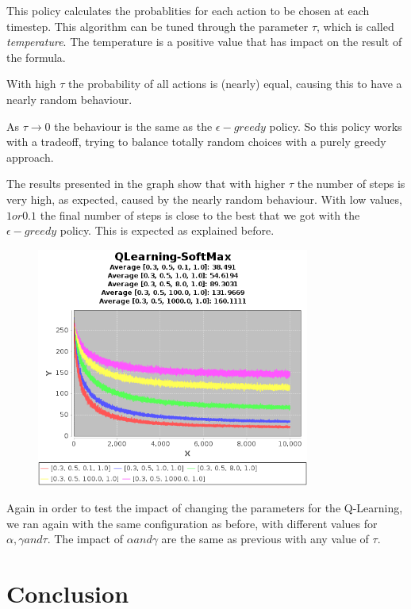 \documentclass{article}
\begin{document}
This policy calculates the probablities for each action to be chosen at each
timestep. This algorithm can be tuned through the parameter $\tau$, which is
called \emph{temperature}.
The temperature is a positive value that has impact on the result of the
formula.

With high $\tau$ the probability of all actions is (nearly) equal, causing
this to have a nearly random behaviour.

As $\tau \rightarrow 0$ the behaviour is the same as the $\epsilon-greedy$
policy.
So this policy works with a tradeoff, trying to balance totally random choices with a purely greedy approach.

The results presented in the graph show that with higher $\tau$ the number of
steps is very high, as expected, caused by the nearly random behaviour. With low
values, $1 or 0.1$ the final number of steps is close to the best that we got
with the $\epsilon-greedy$ policy. This is expected as explained before.

\begin{figure}[htbp]
\centering
\includegraphics[width=0.8\textwidth]{res/alpha_03_gamma_05_temp_01_to_1000_IV_1.png}
\end{figure}

Again in order to test the impact of changing the parameters for the Q-Learning,
we ran again with the same configuration as before, with different values for
$\alpha, \gamma and \tau$. 
The impact of  $\alpha and \gamma$ are the same as previous with any value of
$\tau$.


\section{Conclusion}
\end{document}
